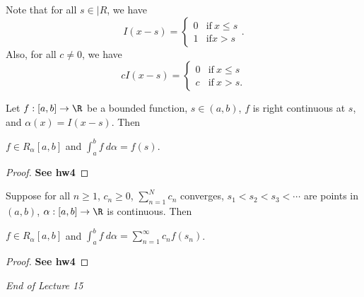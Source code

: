 \begin{remark}
    Note that for all \( s \in |R  \), we have 
    \[  I(x-s) = 
    \begin{cases}
        0 &\text{if} \ x \leq s \\
        1 &\text{if} x > s 
    \end{cases}. \]
    Also, for all \( c \neq 0  \), we have
    \[  c I(x-s) = 
    \begin{cases}
        0 &\text{if} \ x \leq s \\
        c &\text{if} \ x > s.
    \end{cases} \]
\end{remark}

\begin{theorem}[Rudin 6.15]\label{Rudin 6.15}
    Let \( f: [a,b] \to \R  \) be a bounded function, \( s \in (a,b) \), \( f  \) is right continuous at \( s  \), and \( \alpha(x) = I(x-s) \). Then 
    \begin{center}
    \( f \in {R}_{\alpha}[a,b] \) and \( \displaystyle \int_{ a }^{ b }  f  \ d \alpha  = f(s) \).
    \end{center}
\end{theorem}
\begin{proof}
    \textbf{See hw4}
\end{proof}

\begin{theorem}[Rudin 6.16]\label{Rudin 6.16}
    Suppose for all \( n \geq 1  \), \( {c}_{n} \geq 0  \), \( \displaystyle \sum_{ n=1  }^{ N  } {c}_{n} \) converges, \( {s}_{1} < {s}_{2} < {s}_{3} < \cdots   \) are points in \( (a,b) \), \( \alpha:[a,b] \to \R  \) is continuous. Then
    \begin{center}
        \( f \in {R}_{\alpha}[a,b] \) and \( \displaystyle \int_{ a }^{ b } f  \ d \alpha = \displaystyle \sum_{ n=1  }^{ \infty  } {c}_{n} f({s}_{n})  \).
    \end{center}
\end{theorem}
\begin{proof}
    \textbf{See hw4}
\end{proof}

\begin{center}
    \textit{End of Lecture 15} 
\end{center}

